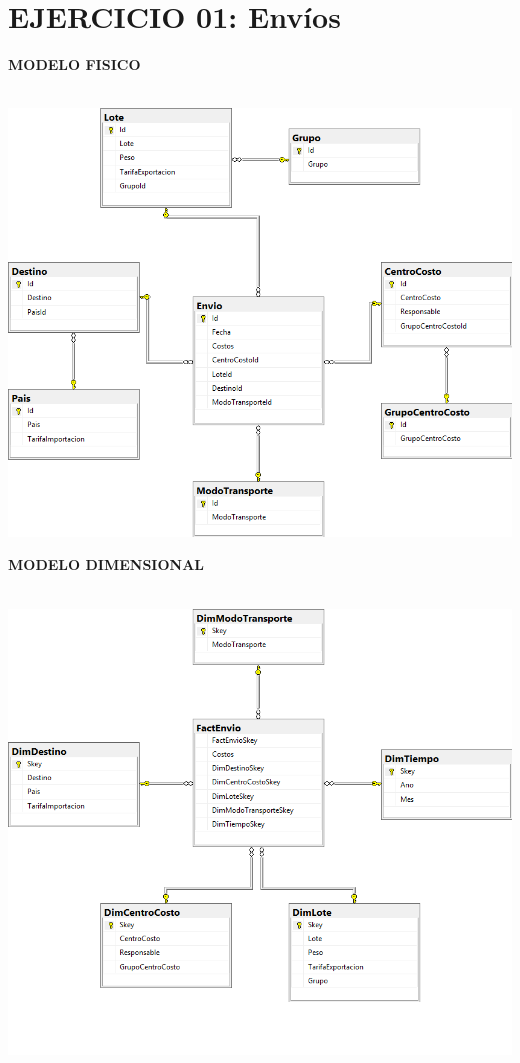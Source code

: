 \section{EJERCICIO 01: Envíos} 

\textbf{MODELO FISICO}\\\\
\begin{center}
\includegraphics[width=\columnwidth]{images/task1/e1}\newline
\end{center}

\textbf{MODELO DIMENSIONAL}\\\\
\begin{center}
\includegraphics[width=\columnwidth]{images/task1/d1}\newline
\end{center}


